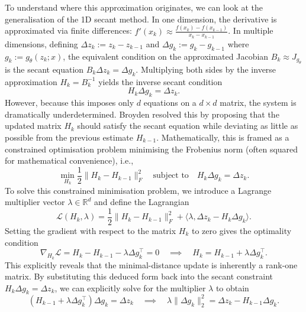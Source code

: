 To understand where this approximation originates, we can look at the generalisation of the 1D secant method. In one dimension, the derivative is approximated via finite differences: $f'(x_k) \approx \frac{f(x_k) - f(x_{k-1})}{x_k - x_{k-1}}$. In multiple dimensions, defining $\Delta z_k := z_k-z_{k-1}$ and $\Delta g_k := g_k-g_{k-1}$ where $g_k := g_\theta(z_k;x)$, the equivalent condition on the approximated Jacobian $B_k \approx J_{g_\theta}$ is the secant equation $B_k \Delta z_k = \Delta g_k$. Multiplying both sides by the inverse approximation $H_k = B_k^{-1}$ yields the inverse secant condition
\begin{equation*}
    H_k \Delta g_k = \Delta z_k.
\end{equation*}
However, because this imposes only $d$ equations on a $d \times d$ matrix, the system is dramatically underdetermined. Broyden resolved this by proposing that the updated matrix $H_k$ should satisfy the secant equation while deviating as little as possible from the previous estimate $H_{k-1}$. Mathematically, this is framed as a constrained optimisation problem minimising the Frobenius norm (often squared for mathematical convenience), i.e.,
\begin{equation*}
    \min_{H_k} \frac{1}{2}\|H_k - H_{k-1}\|_F^2 \quad \text{subject to} \quad H_k \Delta g_k = \Delta z_k.
\end{equation*}
To solve this constrained minimisation problem, we introduce a Lagrange multiplier vector $\lambda \in \mathbb{R}^d$ and define the Lagrangian
\begin{equation*}
    \mathcal{L}(H_k, \lambda) = \frac{1}{2}\|H_k - H_{k-1}\|_F^2 + \langle \lambda, \Delta z_k - H_k \Delta g_k \rangle.
\end{equation*}
Setting the gradient with respect to the matrix $H_k$ to zero gives the optimality condition
\begin{equation*}
    \nabla_{H_k} \mathcal{L} = H_k - H_{k-1} - \lambda \Delta g_k^{\top} = 0 
    \quad \implies \quad 
    H_k = H_{k-1} + \lambda \Delta g_k^{\top}.
\end{equation*}
This explicitly reveals that the minimal-distance update is inherently a rank-one matrix. By substituting this deduced form back into the secant constraint $H_k \Delta g_k = \Delta z_k$, we can explicitly solve for the multiplier $\lambda$ to obtain
\begin{equation*}
    (H_{k-1} + \lambda \Delta g_k^{\top})\Delta g_k = \Delta z_k 
    \quad \implies \quad 
    \lambda \|\Delta g_k\|_2^2 = \Delta z_k - H_{k-1}\Delta g_k.
\end{equation*}
